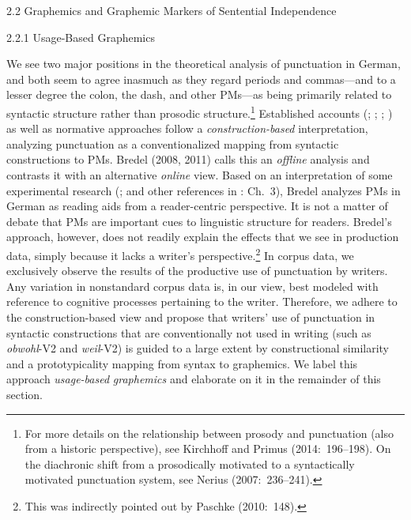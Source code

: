 \begin{styleMoutonHeadingii}
2.2    Graphemics and Graphemic Markers of Sentential Independence
\end{styleMoutonHeadingii}

\begin{styleMoutonHeadingii}
2.2.1  Usage-Based Graphemics
\end{styleMoutonHeadingii}

\begin{styleMoutonText}
We see two major positions in the theoretical analysis of punctuation in German, and both seem to agree inasmuch as they regard periods and commas—and to a lesser degree the colon, the dash, and other PMs—as being primarily related to syntactic structure rather than prosodic structure.\footnote{For more details on the relationship between prosody and punctuation (also from a historic perspective), see Kirchhoff and Primus (2014:~196–198). On the diachronic shift from a prosodically motivated to a syntactically motivated punctuation system, see Nerius (2007:~236–241).} Established accounts (\citealt{Mentrup1983}; \citealt{Behrens1989}; \citealt{Baudusch1995}; \citealt{Gallmann1996}) as well as norma\-tive approaches \citep{AugstEtAl1997} fol\-low a \textit{construction-based} interpretation, analyzing punctuation as a conventionalized mapping from syntactic constructions to PMs. Bredel (2008, 2011) calls this an \textit{offline} analysis and contrasts it with an alternative \textit{online} view. Based on an interpretation of some experimental research (\citealt{FrazierRayner1988}; \citealt{MazukaLust1990} and other references in \citealt{Bredel2008}: Ch.~3), Bredel analyzes PMs in German as reading aids from a reader-centric perspective. It is not a matter of debate that PMs are important cues to linguistic structure for readers. Bredel’s approach, however, does not readily explain the effects that we see in production data, simply because it lacks a writer’s perspective.\footnote{This was indirectly pointed out by Paschke (2010:~148).} In corpus data, we exclusively observe the results of the productive use of punctuation by writers. Any variation in nonstandard corpus data is, in our view, best modeled with reference to cognitive processes pertaining to the writer. Therefore, we adhere to the construction-based view and propose that writers’ use of punctuation in syntactic constructions that are conventionally not used in writing (such as \textit{obwohl}{}-V2 and \textit{weil}{}-V2) is guided to a large extent by constructional similarity and a prototypicality mapping from syntax to graphemics. We label this approach \textit{usage-based} \textit{graphemics} and elaborate on it in the remainder of this section.
\end{styleMoutonText}

